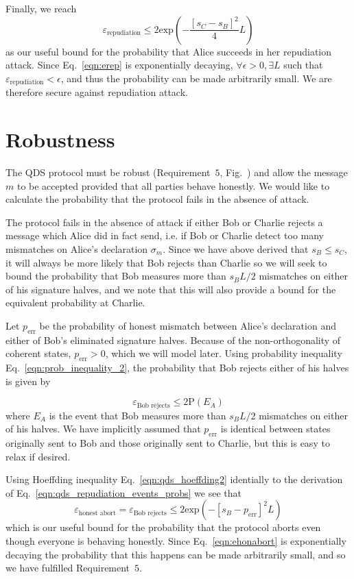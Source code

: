 Finally, we reach
\begin{equation}\label{eqn:erep}
\varepsilon_{\text{repudiation}} \le 2 \text{exp}\left( - \frac{\left[s_C - s_B\right]^2}{4} L\right)
\end{equation}
as our useful bound for the probability that Alice succeeds in her repudiation attack. Since Eq.~\ref{eqn:erep} is exponentially decaying, $\forall \epsilon > 0,  \exists L$ such that $\varepsilon_{\text{repudiation}} < \epsilon$, and thus the probability can be made arbitrarily small. We are therefore secure against repudiation attack.


\section{Robustness}
The QDS protocol must be robust (Requirement~$5$, Fig.~) and allow the message $m$ to be accepted provided that all parties behave honestly. We would like to calculate the probability that the protocol fails in the absence of attack.

The protocol fails in the absence of attack if either Bob or Charlie rejects a message which Alice did in fact send, i.e. if Bob or Charlie detect too many mismatches on Alice's declaration $\sigma_m$. Since we have above derived that $s_B \le s_C$, it will always be more likely that Bob rejects than Charlie so we will seek to bound the probability that Bob measures more than $s_B L/2$ mismatches on either of his signature halves, and we note that this will also provide a bound for the equivalent probability at Charlie.

Let $p_{\text{err}}$ be the probability of honest mismatch between Alice's declaration and either of Bob's eliminated signature halves. Because of the non-orthogonality of coherent states, $p_{\text{err}} > 0$, which we will model later. Using probability inequality Eq.~\ref{eqn:prob_inequality_2}, the probability that Bob rejects either of his halves is given by

\begin{equation}
\varepsilon_{\text{Bob rejects}} \le 2 \text{P}\left(E_A\right)
\end{equation}
where $E_A$ is the event that Bob measures more than $s_B L/2$ mismatches on either of his halves. We have implicitly assumed that $p_{\text{err}}$ is identical between states originally sent to Bob and those originally sent to Charlie, but this is easy to relax if desired.

Using Hoeffding inequality Eq.~\ref{eqn:qds_hoeffding2} identially to the derivation of Eq.~\ref{eqn:qds_repudiation_events_probs} we see that
\begin{equation}\label{eqn:ehonabort}
\varepsilon_{\text{honest abort}} = \varepsilon_{\text{Bob rejects}} \le 2 \text{exp}\left( - \left[s_B - p_{\text{err}}\right]^2 L\right)
\end{equation}
which is our useful bound for the probability that the protocol aborts even though everyone is behaving honestly. Since Eq.~\ref{eqn:ehonabort} is exponentially decaying the probability that this happens can be made arbitrarily small, and so we have fulfilled Requirement~$5$.

